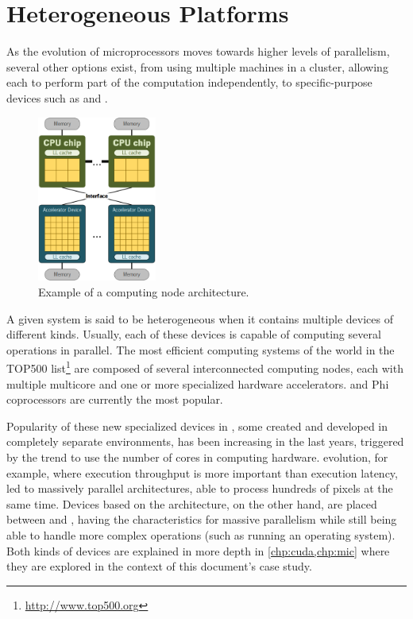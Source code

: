 \documentclass[../thesis]{subfiles}
\begin{document}
	\section{Heterogeneous Platforms}
	\label{sec:techbg:hetplats}

	As the evolution of microprocessors moves towards higher levels of parallelism, several other options exist, from using multiple machines in a cluster, allowing each to perform part of the computation independently, to specific-purpose devices such as \dsps and \gpus.

	\begin{figure}
		\centering
		\includegraphics[width=0.35\textwidth]{assets/images/techbg/hetplat.png}
		\captionsetup{font=small}
		\caption{Example of a computing node architecture.}
		\label{fig:cudacore}
	\end{figure}

	A given system is said to be heterogeneous when it contains multiple devices of different kinds. Usually, each of these devices is capable of computing several operations in parallel. The most efficient computing systems of the world in the TOP500 list\footnote{\url{http://www.top500.org}} are composed of several interconnected computing nodes, each with multiple multicore \cpus and one or more specialized hardware accelerators. \gpus and \intel\xeon Phi coprocessors are currently the most popular.

	Popularity of these new specialized devices in \hpc, some created and developed in completely separate environments, has been increasing in the last years, triggered by the trend to use the number of cores in computing hardware. \gpus evolution, for example, where execution throughput is more important than execution latency, led to massively parallel architectures, able to process hundreds of pixels at the same time. Devices based on the \intel\mic architecture, on the other hand, are placed between \gpus and \cpus, having the characteristics for massive parallelism while still being able to handle more complex operations (such as running an operating system). Both kinds of devices are explained in more depth in \cref{chp:cuda,chp:mic} where they are explored in the context of this document's case study.
\end{document}
